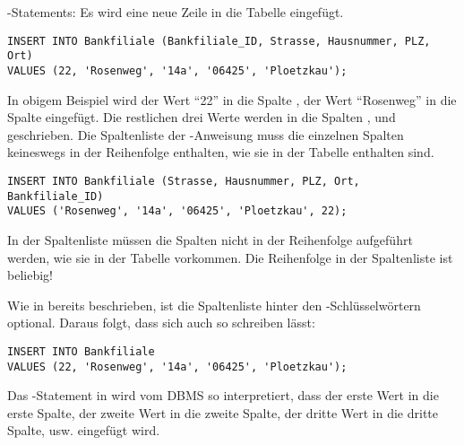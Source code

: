         \INSERT-Statements: Es wird eine neue Zeile in die Tabelle
         eingef\"ugt.
        \begin{lstlisting}[language=oracle_sql,caption={Ein einfaches INSERT},label=sql07_02]
INSERT INTO Bankfiliale (Bankfiliale_ID, Strasse, Hausnummer, PLZ, Ort)
VALUES (22, 'Rosenweg', '14a', '06425', 'Ploetzkau');
        \end{lstlisting}
\clearpage
        In obigem Beispiel wird der Wert \enquote{22} in die Spalte
        , der Wert \enquote{Rosenweg} in die Spalte
         eingef\"ugt. Die restlichen drei Werte werden in
        die Spalten ,  und
         geschrieben.
        Die Spaltenliste der \INSERT-Anweisung muss die einzelnen Spalten keineswegs in der Reihenfolge enthalten, wie sie in der Tabelle enthalten sind.
        \begin{lstlisting}[language=oracle_sql,caption={Ein einfaches INSERT},label=sql07_03]
INSERT INTO Bankfiliale (Strasse, Hausnummer, PLZ, Ort, Bankfiliale_ID)
VALUES ('Rosenweg', '14a', '06425', 'Ploetzkau', 22);
        \end{lstlisting}
        \begin{merke}
          In der Spaltenliste m\"ussen die Spalten nicht in der Reihenfolge
          aufgef\"uhrt werden, wie sie in der Tabelle vorkommen. Die Reihenfolge
          in der Spaltenliste ist beliebig!
        \end{merke}
        \vspace{1em}
        Wie in  bereits beschrieben, ist die Spaltenliste
        hinter den -Schl\"ussel\-w\"ortern optional.
        Daraus folgt, dass sich  auch so schreiben l\"asst:
        \begin{lstlisting}[language=oracle_sql,caption={Ein einfaches INSERT ohne Spaltenliste},label=sql07_04]
INSERT INTO Bankfiliale
VALUES (22, 'Rosenweg', '14a', '06425', 'Ploetzkau');
        \end{lstlisting}
        Das \INSERT-Statement in  wird vom DBMS so
        interpretiert, dass der erste Wert in die erste Spalte, der zweite Wert
        in die zweite Spalte, der dritte Wert in die dritte Spalte, usw.
        eingef\"ugt wird.
